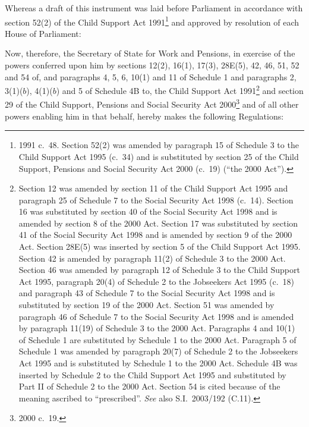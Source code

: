 \documentclass[12pt,a4paper]{article}
\title{\regstitle}
\author{S.I.\ 2003 No.\ 2779}
\date{Made
4th November 2003\\
Coming into force
in accordance with regulation 1
}
\begin{document}
\maketitle

\noindent
Whereas a draft of this instrument was laid before Parliament in accordance with section 52(2) of the Child Support Act 1991\footnote{1991 c.\ 48. Section 52(2) was amended by paragraph 15 of Schedule 3 to the Child Support Act 1995 (c.\ 34) and is substituted by section 25 of the Child Support, Pensions and Social Security Act 2000 (c.\ 19) (“the 2000 Act”).} and approved by resolution of each House of Parliament:

Now, therefore, the Secretary of State for Work and Pensions, in exercise of the powers conferred upon him by sections 12(2), 16(1), 17(3), 28E(5), 42, 46, 51, 52 and 54 of, and paragraphs 4, 5, 6, 10(1) and 11 of Schedule 1 and paragraphs 2, 3(1)($b$), 4(1)($b$)  and 5 of Schedule 4B to, the Child Support Act 1991\footnote{Section 12 was amended by section 11 of the Child Support Act 1995 and paragraph 25 of Schedule 7 to the Social Security Act 1998 (c.\ 14). Section 16 was substituted by section 40 of the Social Security Act 1998 and is amended by section 8 of the 2000 Act. Section 17 was substituted by section 41 of the Social Security Act 1998 and is amended by section 9 of the 2000 Act. Section 28E(5) was inserted by section 5 of the Child Support Act 1995. Section 42 is amended by paragraph 11(2) of Schedule 3 to the 2000 Act. Section 46 was amended by paragraph 12 of Schedule 3 to the Child Support Act 1995, paragraph 20(4) of Schedule 2 to the Jobseekers Act 1995 (c.\ 18) and paragraph 43 of Schedule 7 to the Social Security Act 1998 and is substituted by section 19 of the 2000 Act. Section 51 was amended by paragraph 46 of Schedule 7 to the Social Security Act 1998 and is amended by paragraph 11(19) of Schedule 3 to the 2000 Act. Paragraphs 4 and 10(1) of Schedule 1 are substituted by Schedule 1 to the 2000 Act. Paragraph 5 of Schedule 1 was amended by paragraph 20(7) of Schedule 2 to the Jobseekers Act 1995 and is substituted by Schedule 1 to the 2000 Act. Schedule 4B was inserted by Schedule 2 to the Child Support Act 1995 and substituted by Part II of Schedule 2 to the 2000 Act. Section 54 is cited because of the meaning ascribed to “prescribed”. \emph{See} also S.I.\ 2003/192 (C.11).} and section 29 of the Child Support, Pensions and Social Security Act 2000\footnote{2000 c.\ 19.} and of all other powers enabling him in that behalf, hereby makes the following Regulations: 
\end{document}
